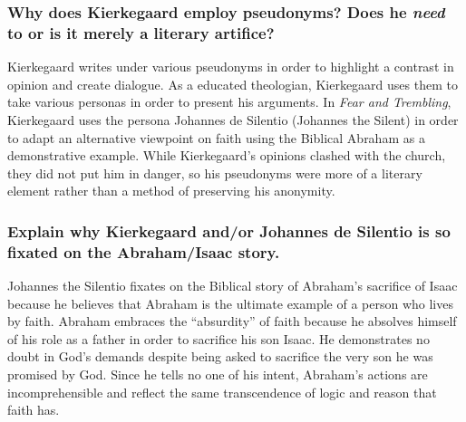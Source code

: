 \documentclass{article}
\begin{document}
\subsubsection*{Why does Kierkegaard employ pseudonyms? Does he \textit{need} to or is it merely a literary artifice?}
Kierkegaard writes under various pseudonyms in order to highlight a contrast in opinion and create dialogue. As a educated theologian, Kierkegaard uses them to take various personas in order to present his arguments. In \textit{Fear and Trembling}, Kierkegaard uses the persona Johannes de Silentio (Johannes the Silent) in order to adapt an alternative viewpoint on faith using the Biblical Abraham as a demonstrative example. While Kierkegaard's opinions clashed with the church, they did not put him in danger, so his pseudonyms were more of a literary element rather than a method of preserving his anonymity.

\subsubsection*{Explain why Kierkegaard and/or Johannes de Silentio is so fixated on the Abraham/Isaac story.}
Johannes the Silentio fixates on the Biblical story of Abraham's sacrifice of Isaac because he believes that Abraham is the ultimate example of a person who lives by faith. Abraham embraces the ``absurdity'' of faith because he absolves himself of his role as a father in order to sacrifice his son Isaac. He demonstrates no doubt in God's demands despite being asked to sacrifice the very son he was promised by God. Since he tells no one of his intent, Abraham's actions are incomprehensible and reflect the same transcendence of logic and reason that faith has.
\end{document}
